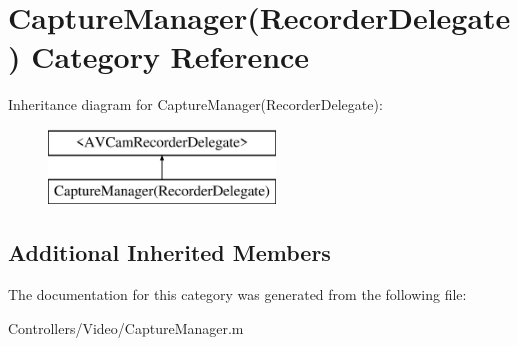 \hypertarget{category_capture_manager_07_recorder_delegate_08}{}\section{Capture\+Manager(Recorder\+Delegate) Category Reference}
\label{category_capture_manager_07_recorder_delegate_08}
Inheritance diagram for Capture\+Manager(Recorder\+Delegate)\+:\begin{figure}[H]
\begin{center}
\leavevmode
\includegraphics[height=2.000000cm]{category_capture_manager_07_recorder_delegate_08}
\end{center}
\end{figure}
\subsection*{Additional Inherited Members}


The documentation for this category was generated from the following file\+:\begin{DoxyCompactItemize}
\item 
Controllers/\+Video/Capture\+Manager.\+m\end{DoxyCompactItemize}
